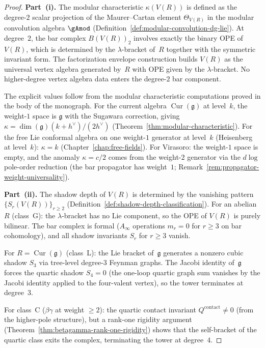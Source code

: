 \begin{proof}
\textbf{Part~(i).}
The modular characteristic $\kappa(V(R))$ is defined as the
degree-$2$ scalar projection of the Maurer--Cartan element
$\Theta_{V(R)}$ in the modular convolution algebra
$\gAmod$
(Definition~\ref{def:modular-convolution-dg-lie}).
At degree~$2$, the bar complex $B(V(R))_2$ involves exactly the
binary OPE of~$V(R)$, which is determined by the
$\lambda$-bracket of~$R$ together with the symmetric invariant
form. The factorization envelope construction
\cite[\S3.7]{BD04} builds $V(R)$ as the universal
vertex algebra generated by~$R$ with OPE given by the
$\lambda$-bracket. No higher-degree vertex algebra data enters
the degree-$2$ bar component.

The explicit values follow from the modular characteristic
computations proved in the body of the monograph.
For the current algebra $\operatorname{Cur}(\mathfrak{g})$
at level~$k$, the weight-$1$ space is $\mathfrak{g}$ with the
Sugawara correction, giving
$\kappa = \dim(\mathfrak{g})(k + h^\vee)/(2h^\vee)$
(Theorem~\ref{thm:modular-characteristic}).
For the free Lie conformal algebra on one weight-$1$ generator
at level~$k$ (Heisenberg at level~$k$): $\kappa = k$
(Chapter~\ref{chap:free-fields}).
For Virasoro: the weight-$1$ space is empty, and the
anomaly $\kappa = c/2$ comes from the weight-$2$ generator via
the $d\log$ pole-order reduction
(the bar propagator has weight~$1$;
Remark~\ref{rem:propagator-weight-universality}).

\textbf{Part~(ii).}
The shadow depth of $V(R)$ is determined by the vanishing
pattern $\{S_r(V(R))\}_{r \geq 2}$
(Definition~\ref{def:shadow-depth-classification}).
For an abelian $R$ (class~G): the $\lambda$-bracket has no Lie
component, so the OPE of $V(R)$ is purely bilinear.
The bar complex is formal ($A_\infty$ operations $m_r = 0$ for
$r \geq 3$ on bar cohomology), and all shadow invariants $S_r$
for $r \geq 3$ vanish.

For $R = \operatorname{Cur}(\mathfrak{g})$ (class~L): the Lie
bracket of~$\mathfrak{g}$ generates a nonzero cubic shadow
$S_3$ via tree-level degree-$3$ Feynman graphs. The Jacobi
identity of~$\mathfrak{g}$ forces the quartic shadow $S_4 = 0$
(the one-loop quartic graph sum vanishes by the Jacobi identity
applied to the four-valent vertex), so the tower terminates at
degree~$3$.

For class~C ($\beta\gamma$ at weight $\geq 2$): the quartic
contact invariant $Q^{\mathrm{contact}} \neq 0$ (from the
higher-pole structure), but a rank-one rigidity argument
(Theorem~\ref{thm:betagamma-rank-one-rigidity}) shows that the
self-bracket of the quartic class exits the complex, terminating
the tower at degree~$4$.


\end{proof}

